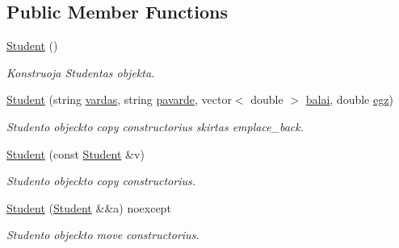 \subsection*{Public Member Functions}
\begin{DoxyCompactItemize}
\item 
\mbox{\label{class_student_af9168cedbfa5565cf0b20c1a9d3f5c9d}} 
\mbox{\hyperlink{class_student_af9168cedbfa5565cf0b20c1a9d3f5c9d}{Student}} ()
\begin{DoxyCompactList}\small\item\em Konstruoja Studentas objekta. \end{DoxyCompactList}\item 
\mbox{\label{class_student_a9cede51655f18e40bdc9a249d73474e3}} 
\mbox{\hyperlink{class_student_a9cede51655f18e40bdc9a249d73474e3}{Student}} (string \mbox{\hyperlink{class_zmogus_a9ba88c78eedc8094a3b38cdf55228bae}{vardas}}, string \mbox{\hyperlink{class_zmogus_a0ccc9864e6fb821e519fc50afd96dfe1}{pavarde}}, vector$<$ double $>$ \mbox{\hyperlink{class_student_afe3edfa7fdf17153c6e081d06b5e8fbd}{balai}}, double \mbox{\hyperlink{class_student_a1faa264ba61eeec2f405ae59bbaf73b5}{egz}})
\begin{DoxyCompactList}\small\item\em Studento objeckto copy constructor\textquotesingle{}ius skirtas emplace\+\_\+back. \end{DoxyCompactList}\item 
\mbox{\label{class_student_aae23d1f0b93ee01ed79c634a6cf7e2a5}} 
\mbox{\hyperlink{class_student_aae23d1f0b93ee01ed79c634a6cf7e2a5}{Student}} (const \mbox{\hyperlink{class_student}{Student}} \&v)
\begin{DoxyCompactList}\small\item\em Studento objeckto copy constructor\textquotesingle{}ius. \end{DoxyCompactList}\item 
\mbox{\label{class_student_ad557663fb6dcc2685b29239057aa27d5}} 
\mbox{\hyperlink{class_student_ad557663fb6dcc2685b29239057aa27d5}{Student}} (\mbox{\hyperlink{class_student}{Student}} \&\&a) noexcept
\begin{DoxyCompactList}\small\item\em Studento objeckto move constructor\textquotesingle{}ius. \end{DoxyCompactList}\item 

\end{DoxyCompactItemize}
